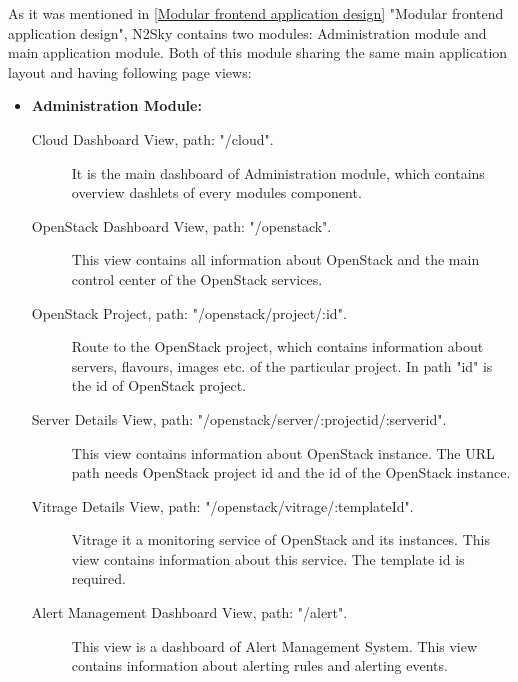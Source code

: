 As it was mentioned in \autoref{Modular frontend application design} "Modular frontend application design", N2Sky contains two modules: Administration module and main application module. Both of this module sharing the same main application layout and having following page views: 
\begin{itemize}
\item \textbf{Administration Module:}
\begin{description}
\item[Cloud Dashboard View, path: "/cloud".] It is the main dashboard of Administration module, which contains overview dashlets of every modules component.
\item[OpenStack Dashboard View, path: "/openstack".] This view contains all information about OpenStack and the main control center of the OpenStack services.
\item[OpenStack Project, path: "/openstack/project/:id".] Route to the OpenStack project, which contains information about servers, flavours, images etc. of the particular project. In path "id" is the id of OpenStack project.
\item[Server Details View, path: "/openstack/server/:projectid/:serverid".] This view contains information about OpenStack instance. The URL path needs OpenStack project id and the id of the OpenStack instance. 
\item[Vitrage Details View, path: "/openstack/vitrage/:templateId".] Vitrage it a monitoring service of OpenStack and its instances. This view contains information about this service. The template id is required.
\item[Alert Management Dashboard View, path: "/alert".]  This view is a dashboard of Alert Management System. This view contains information about alerting rules and alerting events.
\end{description}


\end{itemize}
